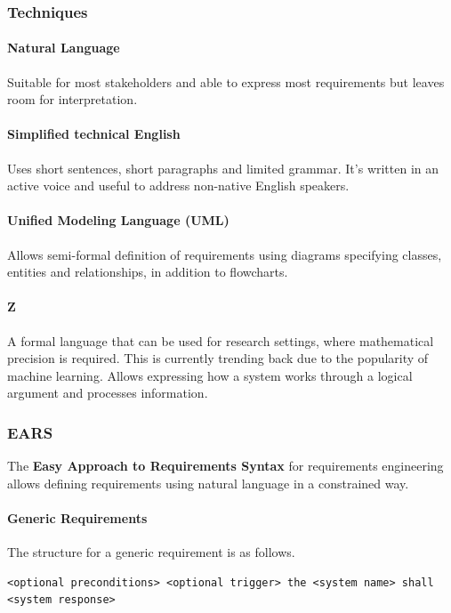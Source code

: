 \subsubsection{Techniques}

\paragraph{Natural Language} Suitable for most stakeholders and able to express most requirements but leaves room for interpretation.

\paragraph{Simplified technical English} Uses short sentences, short paragraphs and limited grammar. It's written in an active voice and useful to address non-native English speakers.

\paragraph{Unified Modeling Language (UML)} Allows semi-formal definition of requirements using diagrams specifying classes, entities and relationships, in addition to flowcharts.

\paragraph{Z} A formal language that can be used for research settings, where mathematical precision is required. This is currently trending back due to the popularity of machine learning. Allows expressing how a system works through a logical argument and processes information.

\subsubsection{EARS}

The \textbf{Easy Approach to Requirements Syntax} for requirements engineering allows defining requirements using natural language in a constrained way.

\paragraph{Generic Requirements} The structure for a generic requirement is as follows.
\begin{verbatim}
<optional preconditions> <optional trigger> the <system name> shall <system response>
\end{verbatim}

